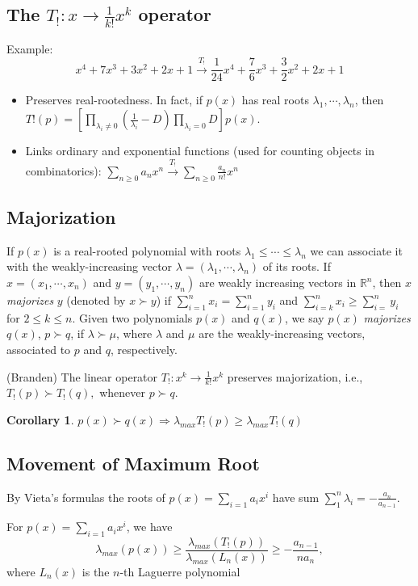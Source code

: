 \documentclass[a0,landscape]{a0poster}
\newtheorem{corollary}{Corollary}
\begin{document}
\begin{multicols}{2}
\section*{The $T_!:x \to \frac{1}{k!}x^k$ operator}

Example:
\[x^4 + 7x^3 + 3x^2 + 2x + 1 \xrightarrow{T_!} \frac{1}{24}x^4 + \frac{7}{6}x^3 + \frac{3}{2}x^2 + 2x + 1\]
\begin{itemize}
 \item Preserves real-rootedness. In fact, if $p(x)$ has real roots $\lambda_1,\cdots,\lambda_n$, then
$T!(p) = [\prod_{\lambda_i \neq 0} (\frac{1}{\lambda_i} - D) \prod_{\lambda_i = 0} D]p(x).$
 \item Links ordinary and exponential functions (used for counting objects in combinatorics):
$\sum_{n\ge 0} a_n x^n \xrightarrow{T_!} \sum_{n\ge 0} \frac{a_n}{n!} x^n$
  
\end{itemize}

\subsection*{Majorization}

If $p(x)$ is a real-rooted polynomial with roots $\lambda_1\leq\cdots\leq\lambda_n$ we can associate it with the weakly-increasing vector $\lambda = (\lambda_1,\cdots,\lambda_n)$ of its roots. If $x = (x_1,\cdots, x_n)$ and $y = (y_1,\cdots, y_n)$ are weakly increasing vectors in $\mathbb{R}^n$, then $x$ \emph{majorizes} $y$ (denoted by $x \succ y$) if $\sum_{i=1}^n x_i = \sum_{i=1}^n y_i$ and $\sum_{i=k}^n x_i \geq \sum_{i=}^n y_i$ for $2 \leq k\leq n.$ Given two polynomials $p(x)$ and $q(x)$, we say $p(x)$ \emph{majorizes} $q(x)$, $p \succ q$, if $\lambda \succ \mu$, where $\lambda$ and $\mu$ are the weakly-increasing vectors, associated to $p$ and $q$, respectively.
\begin{theorem}{(Branden)}
The linear operator $T_!:x^k\to\frac{1}{k!}x^k$ preserves majorization, i.e., $T_!(p) \succ T_!(q),$ whenever $p \succ q$.
\end{theorem}
 \begin{corollary}
  $p(x) \succ q(x) \Rightarrow \lambda_{max} T_!(p) \geq \lambda_{max} T_!(q)$
 \end{corollary}
 
\subsection*{Movement of Maximum Root}
By Vieta's formulas the roots of $p(x) = \sum_{i=1} a_i x^i$ have sum $\sum_1^n \lambda_i = -\frac{a_n}{a_{n-1}}$.
\begin{theorem} For $p(x) = \sum_{i=1} a_i x^i$, we have
\[\lambda_{max}(p(x)) \geq \frac{ \lambda_{max} (T_!(p))}{\lambda_{max}(L_n(x))} \geq -\frac{a_{n-1}}{n a_n},\]
 where $L_n(x)$ is the $n$-th Laguerre polynomial
\end{theorem}



\end{multicols}
\end{document}
